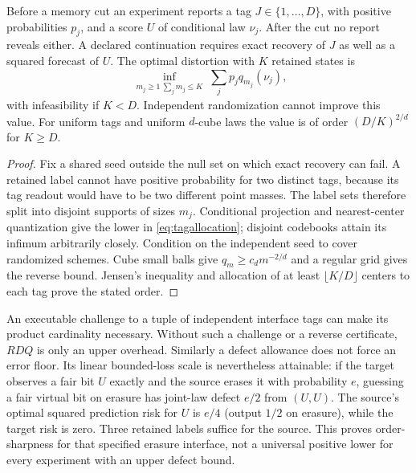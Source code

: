 \begin{proposition}\label{prop:interface}
Before a memory cut an experiment reports a tag $J\in\{1,\ldots,D\}$, with positive probabilities $p_j$, and a score $U$ of conditional law $\nu_j$. After the cut no report reveals either. A declared continuation requires exact recovery of $J$ as well as a squared forecast of $U$. The optimal distortion with $K$ retained states is
\begin{equation}\label{eq:tagallocation}
 \inf_{\substack{m_j\ge1\ \sum_jm_j\le K}}
     \sum_jp_jq_{m_j}(\nu_j),
\end{equation}
with infeasibility if $K<D$. Independent randomization cannot improve this value. For uniform tags and uniform $d$-cube laws the value is of order $(D/K)^{2/d}$ for $K\ge D$.
\end{proposition}
\begin{proof}
Fix a shared seed outside the null set on which exact recovery can fail. A retained label cannot have positive probability for two distinct tags, because its tag readout would have to be two different point masses. The label sets therefore split into disjoint supports of sizes $m_j$. Conditional projection and nearest-center quantization give the lower in \eqref{eq:tagallocation}; disjoint codebooks attain its infimum arbitrarily closely. Condition on the independent seed to cover randomized schemes. Cube small balls give $q_m\ge c_dm^{-2/d}$ and a regular grid gives the reverse bound. Jensen's inequality and allocation of at least $\lfloor K/D\rfloor$ centers to each tag prove the stated order.
\end{proof}

An executable challenge to a tuple of independent interface tags can make its product cardinality necessary. Without such a challenge or a reverse certificate, $RDQ$ is only an upper overhead. Similarly a defect allowance does not force an error floor. Its linear bounded-loss scale is nevertheless attainable: if the target observes a fair bit $U$ exactly and the source erases it with probability $e$, guessing a fair virtual bit on erasure has joint-law defect $e/2$ from $(U,U)$. The source's optimal squared prediction risk for $U$ is $e/4$ (output $1/2$ on erasure), while the target risk is zero. Three retained labels suffice for the source. This proves order-sharpness for that specified erasure interface, not a universal positive lower for every experiment with an upper defect bound.

